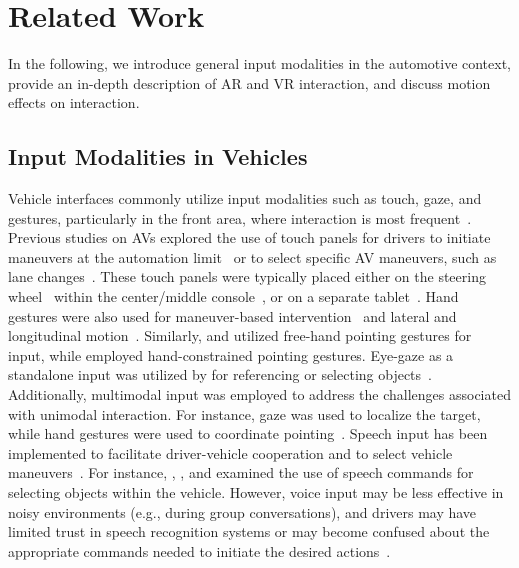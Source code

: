 \section{Related Work}
In the following, we introduce general input modalities in the automotive context, provide an in-depth description of AR and VR interaction, and discuss motion effects on interaction. 

\subsection{Input Modalities in Vehicles}
\label{sec:input-modalities-rw}

Vehicle interfaces commonly utilize input modalities such as touch, gaze, and gestures, particularly in the front area, where interaction is most frequent~\cite{jansenDesignSpaceHuman2022}. 
Previous studies on AVs explored the use of touch panels for drivers to initiate maneuvers at the automation limit~\cite{walch_towards_2016, walch_touch_2017} or to select specific AV maneuvers, such as lane changes~\cite{kauer_how_2010}. These touch panels were typically placed either on the steering wheel~\cite{koyama2014multi, pfeiffer2010multi, doring2011gestural} within the center/middle console~\cite{rumelin_free-hand_2013, ng2016investigating, ahmadTouchscreenUsabilityInput2015, walch2019cooperation, colley2021orias}, or on a separate tablet~\cite{colley2022systematic100m}.
Hand gestures were also used for maneuver-based intervention~\cite{detjen_user-defined_2019, colley2022systematic100m} and lateral and longitudinal motion~\cite{manawadu_hand_2016}. 
Similarly, \citet{rumelin_free-hand_2013} and \citet{colley2022systematic100m} utilized free-hand pointing gestures for input, while \citet{fujimura_driver_2013} employed hand-constrained pointing gestures.
Eye-gaze as a standalone input was utilized by \citet{poitschke_gaze-based_2011} for referencing or selecting objects~\cite{roider_effects_2017, neselrath_combining_2016}. Additionally, multimodal input was employed to address the challenges associated with unimodal interaction. For instance, gaze was used to localize the target, while hand gestures were used to coordinate pointing~\cite{kim_cascaded_2020, roiderSeeYourPoint2018, colley2023effectsurgency}.
Speech input has been implemented to facilitate driver-vehicle cooperation and to select vehicle maneuvers~\cite{ataya_how_2021}. For instance, \citet{roider_effects_2017}, \citet{neselrath_combining_2016}, and \citet{sezgin_multimodal_2009} examined the use of speech commands for selecting objects within the vehicle. However, voice input may be less effective in noisy environments (e.g., during group conversations), and drivers may have limited trust in speech recognition systems or may become confused about the appropriate commands needed to initiate the desired actions~\cite{bengler_hmi_2020, detjen_user-defined_2019}.

